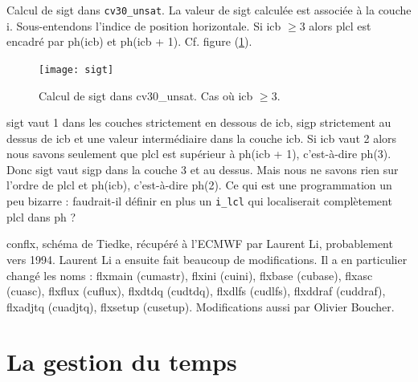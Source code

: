 \documentclass[a4paper,english,french]{article}
\begin{document}
Calcul de sigt dans \verb+cv30_unsat+. La valeur de sigt calculée est
associée à la couche i. Sous-entendons l'indice de position
horizontale. Si icb $\ge 3$ alors plcl est encadré par
ph(icb) et ph(icb + 1). Cf. figure (\ref{fig:sigt}).
\begin{figure}
  \centering
  \texttt{[image: sigt]}
  \caption{Calcul de sigt dans cv30\_unsat. Cas où icb $\ge 3$.}
  \label{fig:sigt}
\end{figure}
sigt vaut 1 dans les couches strictement en dessous de icb, sigp
strictement au dessus de icb et une valeur intermédiaire dans la
couche icb. Si icb vaut 2 alors nous savons seulement que plcl est
supérieur à ph(icb + 1), c'est-à-dire ph(3). Donc sigt vaut sigp dans
la couche 3 et au dessus. Mais nous ne savons rien sur l'ordre de plcl
et ph(icb), c'est-à-dire ph(2). Ce qui est une programmation un peu
bizarre : faudrait-il définir en plus un \verb+i_lcl+ qui localiserait
complètement plcl dans ph ?

conflx, schéma de Tiedke, récupéré à l'ECMWF par Laurent Li,
probablement vers 1994. Laurent Li a ensuite fait beaucoup de
modifications. Il a en particulier changé les noms : flxmain
(cumastr), flxini (cuini), flxbase (cubase), flxasc (cuasc), flxflux
(cuflux), flxdtdq (cudtdq), flxdlfs (cudlfs), flxddraf (cuddraf),
flxadjtq (cuadjtq), flxsetup (cusetup). Modifications aussi par
Olivier Boucher.

\section{La gestion du temps}
\label{sec:time}
\end{document}
